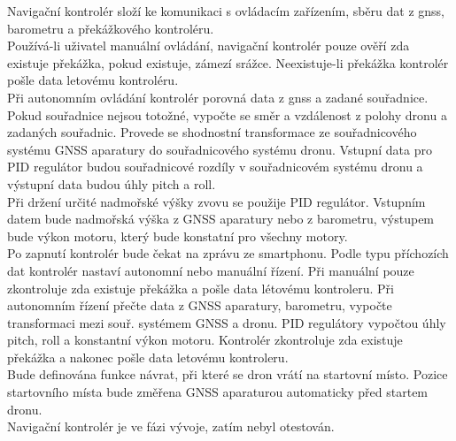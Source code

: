 Navigační kontrolér složí ke komunikaci s ovládacím zařízením, sběru dat z gnss, barometru a překážkového kontroléru.\\
Používá-li uživatel manuální ovládání, navigační kontrolér pouze ověří zda existuje překážka, pokud existuje, zámezí srážce. Neexistuje-li překážka kontrolér pošle data letovému kontroléru.\\
Při autonomním ovládání kontrolér porovná data z gnss a zadané souřadnice. Pokud souřadnice nejsou totožné, vypočte se směr a vzdálenost z polohy dronu a zadaných souřadnic. Provede se shodnostní transformace ze souřadnicového systému GNSS aparatury do souřadnicového systému dronu. Vstupní data pro PID regulátor budou souřadnicové rozdíly v souřadnicovém systému dronu a výstupní data budou úhly pitch a roll.\\
Při držení určité nadmořské výšky zvovu se použije PID regulátor. Vstupním datem bude nadmořská výška z GNSS aparatury nebo z barometru, výstupem bude výkon motoru, který bude konstatní pro všechny motory.\\
Po zapnutí kontrolér bude čekat na zprávu ze smartphonu. Podle typu příchozích dat kontrolér nastaví autonomní nebo manuální řízení. Při manuální pouze zkontroluje zda existuje překážka a pošle data létovému kontroleru. Při autonomním řízení přečte data z GNSS aparatury, barometru, vypočte transformaci mezi souř. systémem GNSS a dronu. PID regulátory vypočtou úhly pitch, roll a konstantní výkon motoru. Kontrolér zkontroluje zda existuje překážka a nakonec pošle data letovému kontroleru.\\
Bude definována funkce návrat, při které se dron vrátí na startovní místo. Pozice startovního místa bude změřena GNSS aparaturou automaticky před startem dronu.\\
Navigační kontrolér je ve fázi vývoje, zatím nebyl otestován.\\


